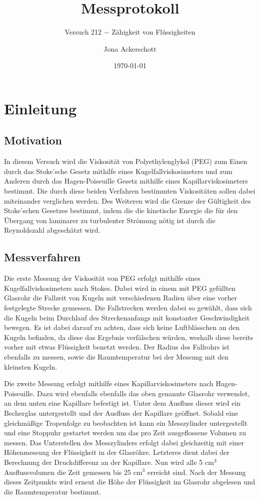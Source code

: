 \documentclass[12pt,a4paper,german]{scrartcl}
\author{Jona Ackerschott}
\title{Messprotokoll}
\subtitle{Versuch 212 $-$ Zähigkeit von Flüssigkeiten}
\date{\today}
\numberwithin{equation}{section}
\begin{document}
  \maketitle

  \tableofcontents

  \newpage
  \section{Einleitung}
  \subsection{Motivation}
  In diesem Versuch wird die Viskosität von Polyethylenglykol (PEG) zum Einen durch das Stoke'sche Gesetz mithilfe eines Kugelfallviskosimeters und zum Anderen durch das Hagen-Poiseuille Gesetz mithilfe eines Kapillarviskosimeters bestimmt.
  Die durch diese beiden Verfahren bestimmten Viskositäten sollen dabei miteinander verglichen werden.
  Des Weiteren wird die Grenze der Gültigkeit des Stoke'schen Gesetzes bestimmt, indem die die kinetische Energie die für den Übergang von laminarer zu turbulenter Strömung nötig ist durch die Reynoldszahl abgeschätzt wird.

  \subsection{Messverfahren}
  Die erste Messung der Viskosität von PEG erfolgt mithilfe eines Kugelfallviskosimeters nach Stokes.
  Dabei wird in einem mit PEG gefüllten Glasrohr die Fallzeit von Kugeln mit verschiedenen Radien über eine vorher festgelegte Strecke gemessen.
  Die Fallstrecken werden dabei so gewählt, dass sich die Kugeln beim Durchlauf des Streckenanfangs mit konstanter Geschwindigkeit bewegen.
  Es ist dabei darauf zu achten, dass sich keine Luftblässchen an den Kugeln befinden, da diese das Ergebnis verfälschen würden, weshalb diese bereits vorher mit etwas Flüssigkeit benetzt werden.
  Der Radius des Fallrohrs ist ebenfalls zu messen, sowie die Raumtemperatur bei der Messung mit den kleinsten Kugeln.

  Die zweite Messung erfolgt mithilfe eines Kapillarviskosimeters nach Hagen-Poiseuille.
  Dazu wird ebenfalls ebenfalls das oben genannte Glasrohr verwendet, an dem unten eine Kapillare befestigt ist.
  Unter dem Ausfluss dieser wird ein Becherglas untergestellt und der Ausfluss der Kapillare geöffnet.
  Sobald eine gleichmäßige Tropenfolge zu beobachten ist kann ein Messzylinder untergestellt und eine Stoppuhr gestartet werden um das pro Zeit ausgeflossene Volumen zu messen.
  Das Unterstellen des Messzylinders erfolgt dabei gleichzeitig mit einer Höhenmessung der Flüssigkeit in der Glasröhre.
  Letzteres dient dabei der Berechnung der Druckdifferenz an der Kapillare.
  Nun wird alle 5 cm$^3$ Ausflussvolumen die Zeit gemessen bis 25 cm$^3$ erreicht sind.
  Nach der Messung dieses Zeitpunkts wird erneut die Höhe der Flüssigkeit im Glasrohr abgelesen und die Raumtemperatur bestimmt.
\end{document}
